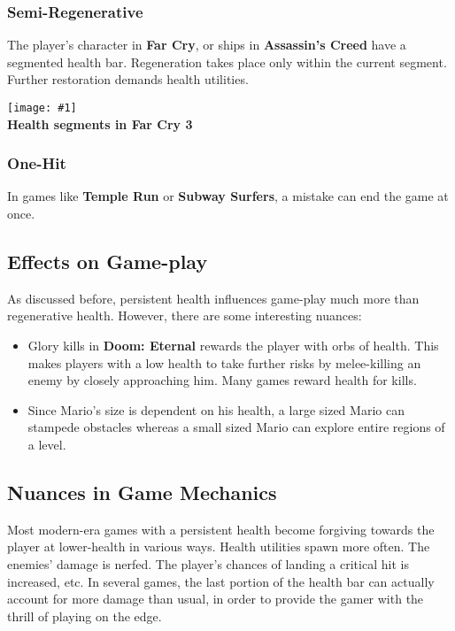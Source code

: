 \documentclass[12pt]{article}
\newcommand{\fig}[3]{\begin{center} \texttt{[image: \#1]}\\ \textbf{#3} \end{center}}
\begin{document}
\subsubsection*{Semi-Regenerative}

The player's character in \textbf{Far Cry}, or ships in \textbf{Assassin's Creed} have a segmented health bar. Regeneration takes place only within the current segment. Further restoration demands health utilities.

\fig{far_cry_3.jpg}{0.5}{Health segments in Far Cry 3}

\subsubsection*{One-Hit}

In games like \textbf{Temple Run} or \textbf{Subway Surfers}, a mistake can end the game at once.

\subsection{Effects on Game-play}

As discussed before, persistent health influences game-play much more than regenerative health. However, there are some interesting nuances:

\begin{itemize}

\item Glory kills in \textbf{Doom: Eternal} rewards the player with orbs of health. This makes players with a low health to take further risks by melee-killing an enemy by closely approaching him. Many games reward health for kills. 

\item Since Mario's size is dependent on his health, a large sized Mario can stampede obstacles whereas a small sized Mario can explore entire regions of a level.

\end{itemize}

\subsection{Nuances in Game Mechanics}

Most modern-era games with a persistent health become forgiving towards the player at lower-health in various ways. Health utilities spawn more often. The enemies' damage is nerfed. The player's chances of landing a critical hit is increased, etc. In several games, the last portion of the health bar can actually account for more damage than usual, in order to provide the gamer with the thrill of playing on the edge.
\end{document}
